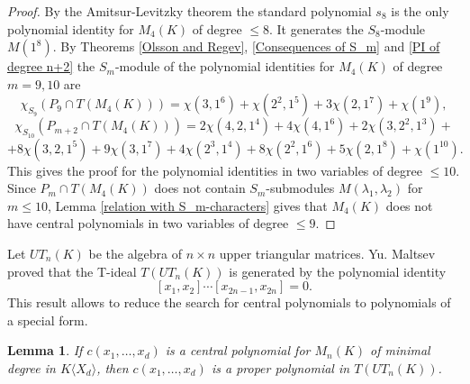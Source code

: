 \documentclass[12pt]{amsart}
\newtheorem{lemma}[theorem]{Lemma}
\theoremstyle{definition}
\begin{document}
\begin{proof}
By the Amitsur-Levitzky theorem the standard polynomial $s_8$ is the only polynomial identity for $M_4(K)$ of degree $\leq 8$.
It generates the $S_8$-module $M(1^8)$. By Theorems \ref{Olsson and Regev}, \ref{Consequences of S_m} and \ref{PI of degree n+2}
the $S_m$-module of the polynomial identities for $M_4(K)$ of degree $m=9,10$ are
\[
\chi_{S_9}(P_{9}\cap T(M_4(K)))=\chi(3,1^6)+\chi(2^2,1^5)+3\chi(2,1^7)+\chi(1^9),
\]
\[
\chi_{S_{10}}(P_{m+2}\cap T(M_4(K)))=
2\chi(4,2,1^4)+4\chi(4,1^6)+2\chi(3,2^2,1^3)+
\]
\[
+8\chi(3,2,1^5)+9\chi(3,1^7)+4\chi(2^3,1^4)
+8\chi(2^2,1^6)+5\chi(2,1^8)+\chi(1^{10}).
\]
This gives the proof for the polynomial identities in two variables of degree $\leq 10$.
Since $P_m\cap T(M_4(K))$ does not contain $S_m$-submodules $M(\lambda_1,\lambda_2)$ for $m\leq 10$, Lemma \ref{relation with S_m-characters} gives that
$M_4(K)$ does not have central polynomials in two variables of degree $\leq 9$.
\end{proof}

Let $UT_n(K)$ be the algebra of $n\times n$ upper triangular matrices.
Yu. Maltsev \cite{Mal} proved that the T-ideal $T(UT_n(K))$ is generated by the polynomial identity
\[
[x_1,x_2]\cdots[x_{2n-1},x_{2n}]=0.
\]
This result allows to reduce the search for central polynomials to polynomials of a special form.

\begin{lemma}\cite[Proposition 4.2 (i)]{DrKas1}\label{reduction to proper}
If $c(x_1,\ldots,x_d)$ is a central polynomial for $M_n(K)$ of minimal degree in $K\langle X_d\rangle$, then
$c(x_1,\ldots,x_d)$ is a proper polynomial in $T(UT_n(K))$.
\end{lemma}
\end{document}
